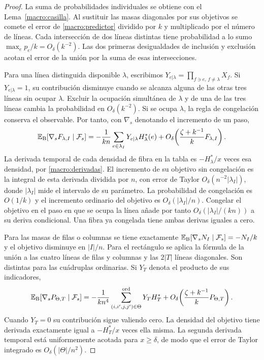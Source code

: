 \begin{proof}
La suma de probabilidades individuales se obtiene con el Lema~\ref{macro:casilla}. Al sustituir las
masas diagonales por sus objetivos se comete el error de \eqref{macro:predictor} dividido por $k$ y
multiplicado por el número de líneas. Cada intersección de dos líneas distintas tiene probabilidad a
lo sumo $\max_e p_e/k=O_\delta(k^{-2})$. Las dos primeras desigualdades de inclusión y exclusión
acotan el error de la unión por la suma de esas intersecciones.

Para una línea distinguida disponible $\lambda$, escribimos $Y_{e|\lambda}=\prod_{f\ni
e,\,f\ne\lambda}X_f$. Si $Y_{e|\lambda}=1$, su contribución disminuye cuando se alcanza alguna de las
otras tres líneas sin ocupar $\lambda$. Excluir la ocupación simultánea de $\lambda$ y de una de las
tres líneas cambia la probabilidad en $O_\delta(k^{-2})$. Si se ocupa $\lambda$, la regla de
congelación conserva el observable. Por tanto, con $\nabla_s$ denotando el incremento de un paso,
\[
 \mathbb{E}_{\rm B}[\nabla_s F_{\lambda,I}\mid\mathcal F_s]
 =-\frac1{kn}\sum_{e\in\lambda_I}Y_{e|\lambda}H_\lambda^*(e)
   +O_\delta\!\left(\frac{\zeta+k^{-1}}{k}F_{\lambda,I}\right).
\]
La derivada temporal de cada densidad de fibra en la tabla es $-H^*_\lambda/x$ veces esa densidad, por
\eqref{macro:derivadas}. El incremento de su objetivo sin congelación es la integral de esta derivada
dividida por $n$, con error de Taylor $O_\delta(n^{-2}|\lambda_I|)$, donde $|\lambda_I|$ mide el
intervalo de su parámetro. La probabilidad de congelación es $O(1/k)$ y el incremento ordinario del
objetivo es $O_\delta(|\lambda_I|/n)$. Congelar el objetivo en el paso en que se ocupa la línea añade
por tanto
$O_\delta(|\lambda_I|/(kn))$ a su deriva condicional. Una fibra ya congelada tiene ambas derivas
iguales a cero.

Para las masas de filas o columnas se tiene exactamente
$\mathbb{E}_{\rm B}[\nabla_s N_I\mid\mathcal F_s]=-N_I/k$ y el objetivo disminuye en $|I|/n$. Para el
rectángulo se aplica la fórmula de la unión a las cuatro líneas de filas y columnas y las $2|T|$
líneas diagonales. Son distintas para las cuádruplas ordinarias. Si $Y_{T}$ denota el producto de sus
indicadores,
\[
 \mathbb{E}_{\rm B}[\nabla_s P_{\Theta,T}\mid\mathcal F_s]
 =-\frac1{kn^4}\sum_{(i,i',j,j')\in\Theta}^{\rm ord}Y_T H_T^*
   +O_\delta\!\left(\frac{\zeta+k^{-1}}{k}P_{\Theta,T}\right).
\]
Cuando $Y_T=0$ su contribución sigue valiendo cero. La densidad del objetivo tiene derivada
exactamente igual a $-H_T^*/x$ veces ella misma. La segunda derivada temporal está uniformemente
acotada para $x\ge\delta$, de modo que el error de Taylor integrado es $O_\delta(|\Theta|/n^2)$.
\end{proof}

